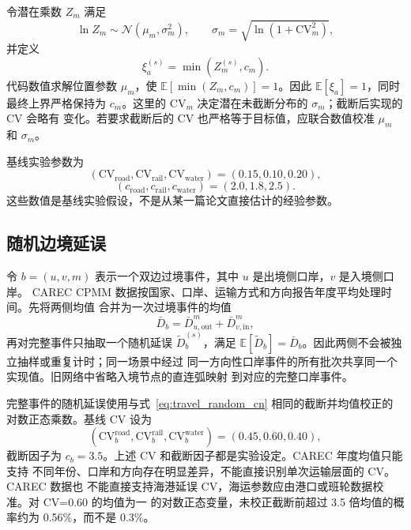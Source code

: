 令潜在乘数 $Z_m$ 满足
\begin{equation}
 \ln Z_m\sim\mathcal N\!\left(\mu_m,\sigma_m^2\right),
 \qquad \sigma_m=\sqrt{\ln(1+\mathrm{CV}_m^2)},
\end{equation}
并定义
\begin{equation}
  \xi_a^{(s)}=\min(Z_m^{(s)},c_m).
\end{equation}
代码数值求解位置参数 $\mu_m$，使
$\mathbb E[\min(Z_m,c_m)]=1$。因此 $\mathbb E[\xi_a]=1$，同时最终上界严格保持为
$c_m$。这里的 $\mathrm{CV}_m$ 决定潜在未截断分布的 $\sigma_m$；截断后实现的 CV 会略有
变化。若要求截断后的 CV 也严格等于目标值，应联合数值校准 $\mu_m$ 和 $\sigma_m$。

基线实验参数为
\begin{equation}
 (\mathrm{CV}_{\mathrm{road}},\mathrm{CV}_{\mathrm{rail}},
 \mathrm{CV}_{\mathrm{water}})=(0.15,0.10,0.20),
\end{equation}
\begin{equation}
 (c_{\mathrm{road}},c_{\mathrm{rail}},c_{\mathrm{water}})=(2.0,1.8,2.5).
\end{equation}
这些数值是基线实验假设，不是从某一篇论文直接估计的经验参数。

\subsection{随机边境延误}

令 $b=(u,v,m)$ 表示一个双边过境事件，其中 $u$ 是出境侧口岸，$v$ 是入境侧口岸。
CAREC CPMM 数据按国家、口岸、运输方式和方向报告年度平均处理时间。先将两侧均值
合并为一次过境事件的均值
\begin{equation}\label{eq:border_two_sides_cn}
  \bar D_b=\bar D_{u,\mathrm{out}}^m+
  \bar D_{v,\mathrm{in}}^m,
\end{equation}
再对完整事件只抽取一个随机延误 $\tilde D_b^{(s)}$，满足
$\mathbb E[\tilde D_b]=\bar D_b$。因此两侧不会被独立抽样或重复计时；同一场景中经过
同一方向性口岸事件的所有批次共享同一个实现值。旧网络中省略入境节点的直连弧映射
到对应的完整口岸事件。

完整事件的随机延误使用与式~\eqref{eq:travel_random_cn} 相同的截断并均值校正的
对数正态乘数。基线 CV 设为
\begin{equation}
 (\mathrm{CV}_{b}^{\mathrm{road}},\mathrm{CV}_{b}^{\mathrm{rail}},
 \mathrm{CV}_{b}^{\mathrm{water}})=(0.45,0.60,0.40),
\end{equation}
截断因子为 $c_b=3.5$。上述 CV 和截断因子都是实验设定。CAREC 年度均值只能支持
不同年份、口岸和方向存在明显差异，不能直接识别单次运输层面的 CV。CAREC 数据也
不能直接支持海港延误 CV，海运参数应由港口或班轮数据校准。对 CV=0.60 的均值为一
的对数正态变量，未校正截断前超过 3.5 倍均值的概率约为 0.56\%，而不是 0.3\%。

